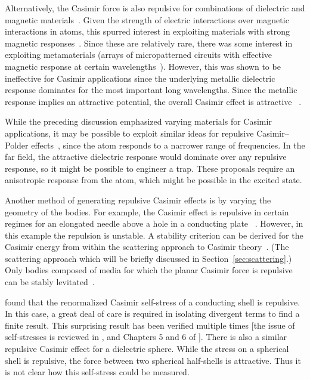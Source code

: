Alternatively, the Casimir force is also repulsive for combinations of dielectric and magnetic materials~\citep{Boyer1974}.  
Given the strength of electric interactions over magnetic interactions in atoms, this spurred interest
in exploiting materials with strong magnetic responses~\citep{Kenneth2002}.  
Since these are relatively rare, there was some interest in exploiting metamaterials (arrays of micropatterned circuits with
effective magnetic response at certain wavelengths~\citep{Pendry1999}).  However, this was shown to be ineffective
for Casimir applications since the underlying metallic dielectric response dominates for the most important long wavelengths.
Since the metallic response implies an attractive potential, the overall Casimir effect is attractive~
\citep{Ianuzzi2003comment,Rosa2008,Pirozhenko2008,Yannopapas2009}.  

While the preceding discussion emphasized varying materials for Casimir applications, it may 
be possible to exploit similar ideas for repulsive Casimir--Polder effects~\citep{Milton2011,Milton2012},
since the atom responds to a narrower range of frequencies.  In the far field, the attractive dielectric
response would dominate over any repulsive response, so it might be possible to engineer a trap.  
These proposals require an anisotropic response from the atom, which might be possible in the excited state.

Another method of generating repulsive Casimir effects is by varying the geometry of the bodies.  
For example, the Casimir effect is repulsive in certain regimes for an elongated needle above a hole in a conducting plate~
\citep{Levin2010,Rodriguez2013}.  However, in this example the repulsion is unstable. 
A stability criterion can be derived for the Casimir energy from within the scattering approach to Casimir theory~\citep{Rahi2010,Rahi2011}.
(The scattering approach which will be briefly discussed in Section~\ref{sec:scattering}.)  Only bodies
composed of media for which the planar Casimir force is repulsive can be stably levitated~\citep{Rahi2011}.

\citet{Boyer1968} found that the renormalized Casimir self-stress of a conducting shell 
is repulsive.  In this case, a great deal of care is required in isolating 
divergent terms to find a finite result.
This surprising result has been verified multiple times [the issue of self-stresses
 is reviewed in \citet{Milton2011}, and Chapters 5 and 6 of \citet{Milton2001}].
There is also a similar repulsive Casimir effect for a dielectric sphere.  
While the stress on a spherical shell is repulsive, the force between two spherical half-shells is attractive.  
Thus it is not clear how this self-stress could be measured.  


